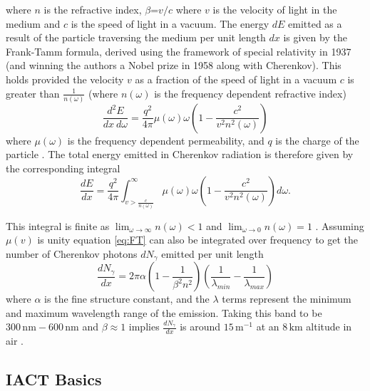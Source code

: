 where $n$ is the refractive index, $\beta$=$v/c$ where $v$ is the velocity of light in the medium and $c$ is the speed of light in a vacuum. The energy $dE$ emitted as a result of the particle traversing the medium per unit length $dx$ is given by the Frank-Tamm formula, derived using the framework of special relativity in 1937 (and winning the authors a Nobel prize in 1958 along with Cherenkov). This holds provided the velocity $v$ as a fraction of the speed of light in a vacuum $c$ is greater than $\frac{1}{n(\omega)}$ (where $n(\omega)$ is the frequency dependent refractive index)
\begin{equation}
    \frac{d^2E}{dx\ d\omega}=\frac{q^2}{4\pi}\mu(\omega)\omega\left(1- \frac{c^2}{v^2n^2(\omega)} \right)
    \label{eq:FT}
\end{equation}
where $\mu(\omega)$ is the frequency dependent permeability, and $q$ is the charge of the particle \cite{franktamm}. The total energy emitted in Cherenkov radiation is therefore given by the corresponding integral
\begin{equation}
    \frac{dE}{dx}=\frac{q^2}{4\pi}\int_{v>\frac{c}{n(\omega)}}^{\infty}\mu(\omega)\omega \left(1- \frac{c^2}{v^2n^2(\omega)} \right) d \omega .
    \label{eq:FT2}
\end{equation}

This integral is finite as $\lim_{\omega \to \infty} n(\omega)<1$ and $\lim_{\omega \to 0} n(\omega)=1$ . Assuming $\mu(v)$ is unity equation \ref{eq:FT} can also be integrated over frequency \cite{katz} to get the number of Cherenkov photons $dN_{\gamma}$ emitted per unit length
\begin{equation}
    \frac{dN_{\gamma}}{dx}=2\pi\alpha \left( 1- \frac{1}{\beta^2n^2} \right) \left(\frac{1}{\lambda_{min}}-\frac{1}{\lambda_{max}} \right)
\end{equation}
where $\alpha$ is the fine structure constant, and the $\lambda$ terms represent the minimum and maximum wavelength range of the emission. Taking this band to be $\mathrm{300\,nm-600\,nm}$ and $\beta\approx\mathrm{1}$ implies $\frac{dN_{\gamma}}{dx}$ is around $\mathrm{15\,m^{-1}}$ at an $\mathrm{8\,km}$ altitude in air \cite{katz}. 
\subsection{IACT Basics}

